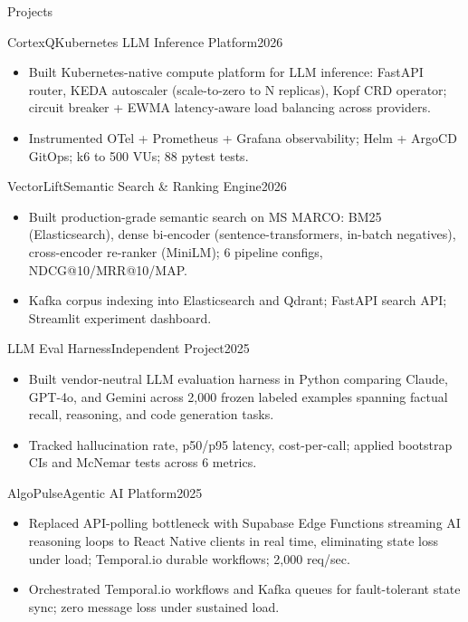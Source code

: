 \documentclass[]{mcdowellcv}
\begin{document}
\begin{cvsection}{Projects}
  \begin{cvsubsection}{CortexQ}{Kubernetes LLM Inference Platform}{2026}
    \begin{itemize}
      \item Built Kubernetes-native compute platform for LLM inference: FastAPI router, KEDA autoscaler (scale-to-zero to N replicas), Kopf CRD operator; circuit breaker + EWMA latency-aware load balancing across providers.
      \item Instrumented OTel + Prometheus + Grafana observability; Helm + ArgoCD GitOps; k6 to 500 VUs; 88 pytest tests.
    \end{itemize}
    \vspace{-1.5pt}
  \end{cvsubsection}

  \begin{cvsubsection}{VectorLift}{Semantic Search \& Ranking Engine}{2026}
    \begin{itemize}
      \item Built production-grade semantic search on MS MARCO: BM25 (Elasticsearch), dense bi-encoder (sentence-transformers, in-batch negatives), cross-encoder re-ranker (MiniLM); 6 pipeline configs, NDCG@10/MRR@10/MAP.
      \item Kafka corpus indexing into Elasticsearch and Qdrant; FastAPI search API; Streamlit experiment dashboard.
    \end{itemize}
    \vspace{-1.5pt}
  \end{cvsubsection}

  \begin{cvsubsection}{LLM Eval Harness}{Independent Project}{2025}
    \begin{itemize}
      \item Built vendor-neutral LLM evaluation harness in Python comparing Claude, GPT-4o, and Gemini across 2,000 frozen labeled examples spanning factual recall, reasoning, and code generation tasks.
      \item Tracked hallucination rate, p50/p95 latency, cost-per-call; applied bootstrap CIs and McNemar tests across 6 metrics.
    \end{itemize}
    \vspace{-1.5pt}
  \end{cvsubsection}

  \begin{cvsubsection}{AlgoPulse}{Agentic AI Platform}{2025}
    \begin{itemize}
      \item Replaced API-polling bottleneck with Supabase Edge Functions streaming AI reasoning loops to React Native clients in real time, eliminating state loss under load; Temporal.io durable workflows; 2,000 req/sec.
      \item Orchestrated Temporal.io workflows and Kafka queues for fault-tolerant state sync; zero message loss under sustained load.
    \end{itemize}
  \end{cvsubsection}
\end{cvsection}
\end{document}
